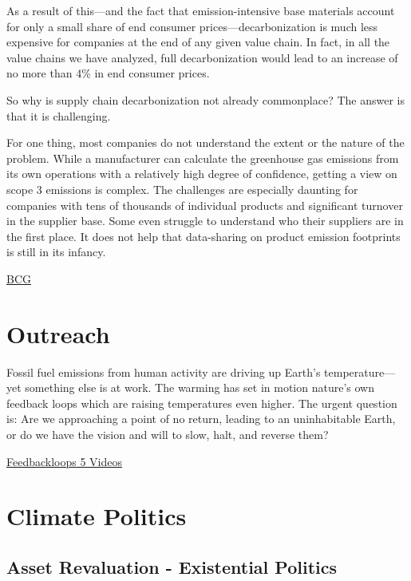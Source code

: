 \documentclass[
]{book}
\begin{document}
As a result of this---and the fact that emission-intensive base materials account for only a small share of end consumer prices---decarbonization is much less expensive for companies at the end of any given value chain. In fact, in all the value chains we have analyzed, full decarbonization would lead to an increase of no more than 4\% in end consumer prices.

So why is supply chain decarbonization not already commonplace? The answer is that it is challenging.

For one thing, most companies do not understand the extent or the nature of the problem. While a manufacturer can calculate the greenhouse gas emissions from its own operations with a relatively high degree of confidence, getting a view on scope 3 emissions is complex. The challenges are especially daunting for companies with tens of thousands of individual products and significant turnover in the supplier base. Some even struggle to understand who their suppliers are in the first place. It does not help that data-sharing on product emission footprints is still in its infancy.

\href{https://www.bcg.com/publications/2021/fighting-climate-change-with-supply-chain-decarbonization}{BCG}

\hypertarget{outreach}{%
\chapter{Outreach}\label{outreach}}

Fossil fuel emissions from human activity are driving up Earth's temperature---
yet something else is at work.
The warming has set in motion nature's own feedback loops
which are raising temperatures even higher.
The urgent question is:
Are we approaching a point of no return, leading to an uninhabitable Earth,
or do we have the vision and will to slow, halt, and reverse them?

\href{https://feedbackloopsclimate.com/introduction/}{Feedbackloops 5 Videos}

\hypertarget{climate-politics}{%
\chapter{Climate Politics}\label{climate-politics}}

\hypertarget{asset-revaluation---existential-politics}{%
\section{Asset Revaluation - Existential Politics}\label{asset-revaluation---existential-politics}}
\end{document}
